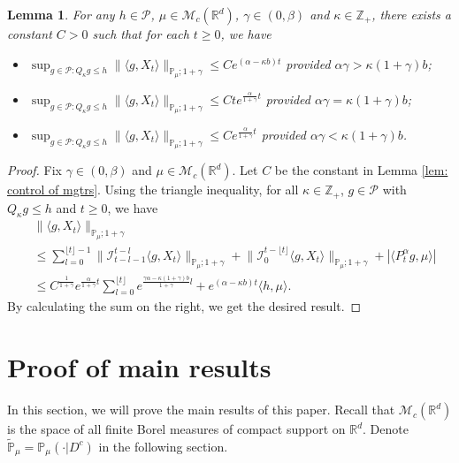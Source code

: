 \documentclass[12pt,a4paper]{amsart}
\theoremstyle{plain}
\newtheorem{lem}[thm]{Lemma}
\theoremstyle{definition}
\numberwithin{equation}{section}
\begin{document}
\begin{lem}
\label{lem: control moment}
    For any $h \in \mathcal P$, $\mu \in \mathcal M_c(\mathbb R^d)$, $\gamma\in (0, \beta)$ and $\kappa \in \mathbb Z_+$, there exists a constant $C > 0$ such that for each $t\geq 0$, we have
\begin{itemize}
\item[(1)]
    $\sup_{g\in \mathcal P: Q_\kappa g \leq h}\|\langle g,X_t\rangle\|_{\mathbb{P}_{\mu};1+\gamma}\leq C e^{(\alpha-\kappa b)t}$ provided $\alpha\gamma > \kappa (1+\gamma)b$;
\item[(2)]
    $\sup_{g\in \mathcal P: Q_\kappa g \leq h}\|\langle g,X_t\rangle\|_{\mathbb{P}_{\mu};1+\gamma}\leq C te^{\frac{\alpha}{1+\gamma}t}$ provided $\alpha\gamma = \kappa (1+\gamma)b$;
\item[(3)]
    $\sup_{g\in \mathcal P: Q_\kappa g \leq h} \|\langle g,X_t\rangle\|_{\mathbb{P}_{\mu};1+\gamma}\leq C e^{\frac{\alpha}{1+\gamma}t}$ provided $\alpha\gamma < \kappa (1+\gamma)b$.
\end{itemize}
\end{lem}
\begin{proof}
    Fix $\gamma \in (0,\beta)$ and $\mu \in \mathcal M_c(\mathbb R^d)$.
    Let $C$ be the constant in Lemma \ref{lem: control of mgtrs}.
    Using the triangle inequality, for all $\kappa\in \mathbb Z_+$, $g \in \mathcal P$ with $Q_\kappa g \leq h$ and $t\geq 0$, we have
\begin{equation}\begin{split}
    &\|\langle g,X_t\rangle\|_{\mathbb P_\mu;1+\gamma}
    \\ &\leq \sum_{l=0}^{\lfloor t\rfloor - 1}\big\| \mathcal{I}_{t-l-1}^{t-l}\langle g,X_t\rangle \big\|_{\mathbb P_\mu;1+\gamma}+\big\| \mathcal{I}_{0}^{t-\lfloor t \rfloor}\langle g,X_t\rangle  \big\|_{\mathbb P_\mu;1+\gamma}
    + |\langle P^\alpha_t g,\mu\rangle|
    \\ &\leq C^{\frac{1}{1+\gamma}} e^{\frac{\alpha}{1+\gamma}t} \sum_{l=0}^{\lfloor t\rfloor} e^{\frac{\gamma\alpha-\kappa (1+\gamma)b}{1+\gamma} l} + e^{(\alpha - \kappa b)t} \langle h,\mu\rangle.
\end{split}\end{equation}
    By calculating the sum on the right, we get the desired result.
\end{proof}
\section{Proof of main results}
In this section, we will prove the main results of this paper. Recall that $\mathcal{M}_c(\mathbb{R}^d)$ is the space of all finite Borel measures of compact support on $\mathbb{R}^d$. Denote  $\mathbb{\tilde{P}}_{\mu}=\mathbb{P}_{\mu}(\cdot|D^c)$ in the following section.
\end{document}

